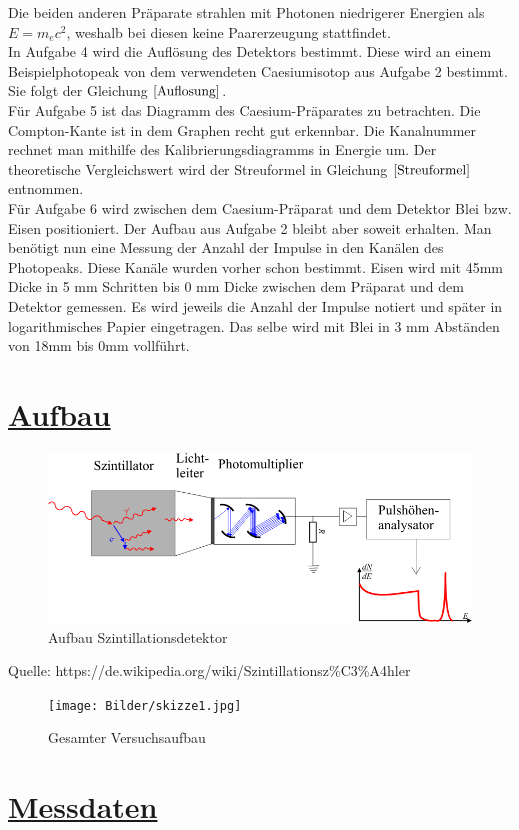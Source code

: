 \documentclass[11pt,a4paper]{article}
\begin{document}
  Die beiden anderen Präparate strahlen mit Photonen niedrigerer Energien als $E=m_ec^2$, weshalb bei diesen keine Paarerzeugung stattfindet.
  \\In Aufgabe 4 wird die Auflösung des Detektors bestimmt. Diese wird an einem Beispielphotopeak von dem verwendeten Caesiumisotop aus Aufgabe 2 bestimmt. Sie folgt der Gleichung $\ref{Auflosung}$.
    \\Für Aufgabe 5 ist das Diagramm des Caesium-Präparates zu betrachten. Die Compton-Kante ist in dem Graphen recht gut erkennbar.
  Die Kanalnummer rechnet man mithilfe des Kalibrierungsdiagramms in Energie um.
  Der theoretische Vergleichswert wird der Streuformel in Gleichung $\ref{Streuformel}$ entnommen.
  \\Für Aufgabe 6 wird zwischen dem Caesium-Präparat und dem Detektor Blei bzw. Eisen positioniert. 
  Der Aufbau aus Aufgabe 2 bleibt aber soweit erhalten. 
  Man benötigt nun eine Messung der Anzahl der Impulse in den Kanälen des Photopeaks. Diese Kanäle wurden vorher schon bestimmt.   
  Eisen wird mit 45mm Dicke in 5 mm Schritten bis 0 mm Dicke zwischen dem Präparat und dem Detektor gemessen. 
  Es wird jeweils die Anzahl der Impulse notiert und später in logarithmisches Papier eingetragen.
  Das selbe wird mit Blei in 3 mm Abständen von 18mm bis 0mm vollführt.
  
  \newpage
\section{\underline{Aufbau}}
 \begin{figure}[H]
 \includegraphics{Bilder/Szint.png}
 \caption{Aufbau Szintillationsdetektor }
  \end{figure}
 Quelle: https://de.wikipedia.org/wiki/Szintillationsz\%C3\%A4hler
 \begin{figure}[H]
 \center
 \texttt{[image: Bilder/skizze1.jpg]}
 \caption{Gesamter Versuchsaufbau}
 \end{figure} 
 \newpage
 \section{\underline{Messdaten}}
 
\end{document}
